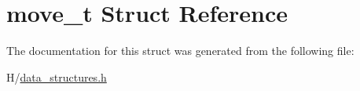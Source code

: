 \hypertarget{structmove__t}{
\section{move\_\-t Struct Reference}
\label{structmove__t}
}


The documentation for this struct was generated from the following file:\begin{DoxyCompactItemize}
\item 
H/\hyperlink{data__structures_8h}{data\_\-structures.h}\end{DoxyCompactItemize}
